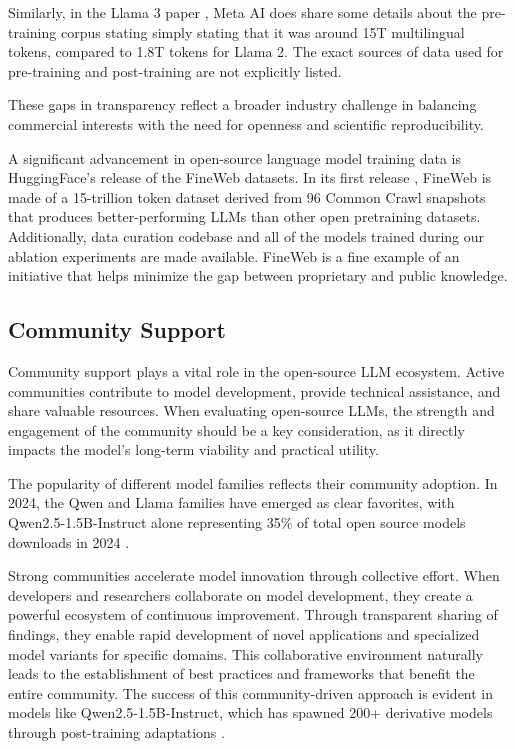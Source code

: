 Similarly, in the Llama 3 paper , Meta AI does share some details about the pre-training corpus stating simply stating that it was around 15T multilingual tokens, compared to 1.8T tokens for Llama 2. The exact sources of data used for pre-training and post-training are not explicitly listed.

These gaps in transparency reflect a broader industry challenge in balancing commercial interests with the need for openness and scientific reproducibility.

A significant advancement in open-source language model training data is HuggingFace's release of the FineWeb datasets. In its first release , FineWeb is made of a 15-trillion token dataset derived from 96 Common Crawl snapshots that produces better-performing LLMs than other open pretraining datasets. Additionally, data curation codebase and all of the models trained during our ablation experiments are made available. FineWeb is a fine example of an initiative that helps minimize the gap between proprietary and public knowledge.

\subsection{Community Support}

Community support plays a vital role in the open-source LLM ecosystem. Active communities contribute to model development, provide technical assistance, and share valuable resources. When evaluating open-source LLMs, the strength and engagement of the community should be a key consideration, as it directly impacts the model's long-term viability and practical utility.

The popularity of different model families reflects their community adoption. In 2024, the Qwen and Llama families have emerged as clear favorites, with Qwen2.5-1.5B-Instruct alone representing 35\% of total open source models downloads in 2024 .

Strong communities accelerate model innovation through collective effort. When developers and researchers collaborate on model development, they create a powerful ecosystem of continuous improvement. Through transparent sharing of findings, they enable rapid development of novel applications and specialized model variants for specific domains. This collaborative environment naturally leads to the establishment of best practices and frameworks that benefit the entire community. The success of this community-driven approach is evident in models like Qwen2.5-1.5B-Instruct, which has spawned 200+ derivative models through post-training adaptations .

